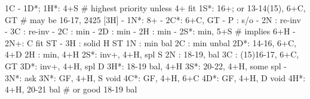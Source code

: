 1C - 1D*;
1H*: 4+S  # highest priority unless 4+ fit
1S*: 16+; or 13-14(15), 6+C, GT  # may be 16-17, 2425 [3H]
   - 1N*: 8+
        - 2C*: 6+C, GT
             - P  : s/o
             - 2N : re-inv
             - 3C : re-inv
   - 2C : min
   - 2D : min
   - 2H : min
   - 2S*: min, 5+S  # implies 6+H
   - 2N+: C fit ST
   - 3H : solid H ST
1N : min bal
2C : min unbal
2D*: 14-16, 6+C, 4+D
2H : min, 4+H
2S*: inv+, 4+H, spl S
2N : 18-19, bal
3C : (15)16-17, 6+C, GT
3D*: inv+, 4+H, spl D
3H*: 18-19 bal, 4+H
3S*: 20-22, 4+H, some spl
   - 3N*: ask
3N*: GF, 4+H, S void 
4C*: GF, 4+H, 6+C
4D*: GF, 4+H, D void 
4H*: 4+H, 20-21 bal  # or good 18-19 bal
